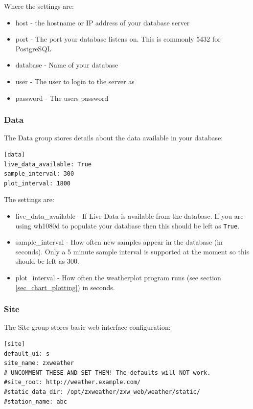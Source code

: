\documentclass[a4paper,10pt,draft]{book}
\begin{document}
Where the settings are:
\begin{itemize}
\item host - the hostname or IP address of your database server
\item port - The port your database listens on. This is commonly 5432 for PostgreSQL
\item database - Name of your database
\item user - The user to login to the server as
\item password - The users password
\end{itemize}


\subsubsection{Data}
The Data group stores details about the data available in your database:

\begin{verbatim}
[data]
live_data_available: True
sample_interval: 300
plot_interval: 1800
\end{verbatim}

The settings are:
\begin{itemize}
\item live\_data\_available - If Live Data is available from the database. If you are using wh1080d to populate your database then this should be left as \verb|True|.
\item sample\_interval - How often new samples appear in the database (in seconds). Only a 5 minute sample interval is supported at the moment so this should be left as 300.
\item plot\_interval - How often the weatherplot program runs (see section \ref{sec_chart_plotting}) in seconds. 
\end{itemize}

\subsubsection{Site}
The Site group stores basic web interface configuration:
\begin{verbatim}
[site]
default_ui: s
site_name: zxweather
# UNCOMMENT THESE AND SET THEM! The defaults will NOT work.
#site_root: http://weather.example.com/
#static_data_dir: /opt/zxweather/zxw_web/weather/static/
#station_name: abc
\end{verbatim}
\end{document}
